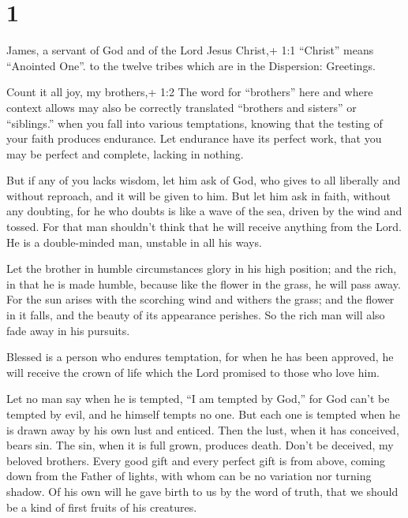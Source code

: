 \hypertarget{section}{%
\section{1}\label{section}}

 James, a servant of God and of the Lord Jesus Christ,+ 1:1
``Christ'' means ``Anointed One''. to the twelve tribes which are in the
Dispersion: Greetings.

 Count it all joy, my brothers,+ 1:2 The word for
``brothers'' here and where context allows may also be correctly
translated ``brothers and sisters'' or ``siblings.'' when you fall into
various temptations,  knowing that the testing of your faith
produces endurance.  Let endurance have its perfect work,
that you may be perfect and complete, lacking in nothing.

 But if any of you lacks wisdom, let him ask of God, who
gives to all liberally and without reproach, and it will be given to
him.  But let him ask in faith, without any doubting, for he
who doubts is like a wave of the sea, driven by the wind and tossed.
 For that man shouldn't think that he will receive anything
from the Lord.  He is a double-minded man, unstable in all
his ways.

 Let the brother in humble circumstances glory in his high
position;  and the rich, in that he is made humble, because
like the flower in the grass, he will pass away.  For the
sun arises with the scorching wind and withers the grass; and the flower
in it falls, and the beauty of its appearance perishes. So the rich man
will also fade away in his pursuits.

 Blessed is a person who endures temptation, for when he
has been approved, he will receive the crown of life which the Lord
promised to those who love him.

 Let no man say when he is tempted, ``I am tempted by
God,'' for God can't be tempted by evil, and he himself tempts no one.
 But each one is tempted when he is drawn away by his own
lust and enticed.  Then the lust, when it has conceived,
bears sin. The sin, when it is full grown, produces death. 
Don't be deceived, my beloved brothers.  Every good gift
and every perfect gift is from above, coming down from the Father of
lights, with whom can be no variation nor turning shadow. 
Of his own will he gave birth to us by the word of truth, that we should
be a kind of first fruits of his creatures.

